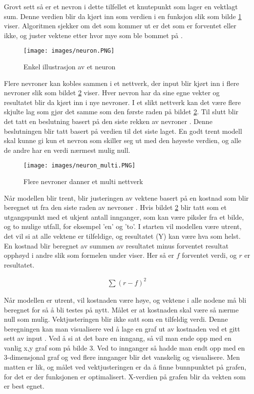 Grovt sett så er et nevron i dette tilfellet et knutepunkt som lager en vektlagt sum. Denne verdien blir da kjørt inn som verdien i en funksjon slik som bilde \ref{fig:neuron} viser. Algoritmen sjekker om det som kommer ut er det som er forventet eller ikke, og juster vektene etter hvor mye som ble bommet på \cite{Bonaccorso2017}.

\begin{figure}[ht]
    \centering
    \texttt{[image: images/neuron.PNG]}
    \caption{Enkel illustrasjon av et neuron}
    \label{fig:neuron}
\end{figure}
\newpage
Flere nevroner kan kobles sammen i et nettverk, der input blir kjørt inn i flere nevroner slik som bildet \ref{fig:nettverk} viser. Hver nevron har da sine egne vekter og resultatet blir da kjørt inn i nye nevroner. I et slikt nettverk kan det være flere skjulte lag som gjør det samme som den første raden på bildet \ref{fig:nettverk}. Til slutt blir det tatt en beslutning basert på den siste rekken av nevroner \cite{Bonaccorso2017}. Denne beslutningen blir tatt basert på verdien til det siste laget. En godt trent modell skal kunne gi kun et nevron som skiller seg ut med den høyeste verdien, og alle de andre har en verdi nærmest mulig null.

\begin{figure}[ht]
    \centering
    \texttt{[image: images/neuron\_multi.PNG]}
    \caption{Flere nevroner danner et multi nettverk}
    \label{fig:nettverk}
\end{figure}

Når modellen blir trent, blir justeringen av vektene basert på en kostnad som blir beregnet ut fra den siste raden av nevroner \cite{neural_net}. Hvis bildet \ref{fig:nettverk} blir tatt som et utgangspunkt med et ukjent antall innganger, som kan være piksler fra et bilde, og to mulige utfall, for eksempel ’en’ og ’to’. I starten vil modellen være utrent, det vil si at alle vektene er tilfeldige, og resultatet (Y) kan være hva som helst. En kostnad  blir beregnet av summen av resultatet minus forventet resultat opphøyd i andre slik som formelen under viser. Her så er $f$ forventet verdi, og $r$ er resultatet.

\begin{align}
	\sum{(r-f)^2}
\end{align}

Når modellen er utrent, vil kostnaden være høye, og vektene i alle nodene må bli beregnet for så å bli testes på nytt. Målet er at kostnaden skal være så nærme null som mulig. Vektjusteringen blir ikke satt som en tilfeldig verdi. Denne beregningen kan man visualisere ved å lage en graf ut av kostnaden ved et gitt sett av input \cite{neural_net}. Ved å si at det bare en inngang, så vil man ende opp med en vanlig x,y graf som på bilde 3. Ved to innganger så hadde man endt opp med en 3-dimensjonal graf og ved flere innganger blir det vanskelig og visualisere. Men matten er lik, og målet ved vektjusteringen er da å finne bunnpunktet på grafen, for det er der funksjonen er optimalisert. X-verdien på grafen blir da vekten som er best egnet.

